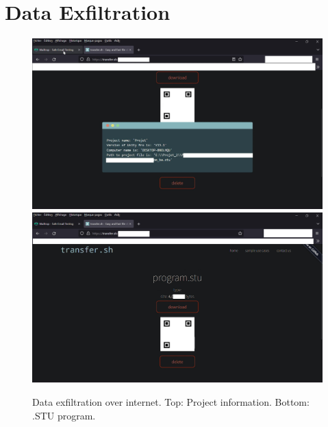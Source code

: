 \chapter{Data Exfiltration}
\begin{figure}[H]
    \centering
    \vspace{-0.5cm}
    \includegraphics[width=0.7\linewidth]{figures/mailtrap-project-infos.jpg}
    \\ \vspace{0.5cm}
    \includegraphics[width=0.7\linewidth]{figures/mailtrap-stu.jpg}
    \caption{Data exfiltration over internet. Top: Project information. Bottom: .STU program.}
    \label{fig:mailtrap-exfiltrate-data}
\end{figure}

